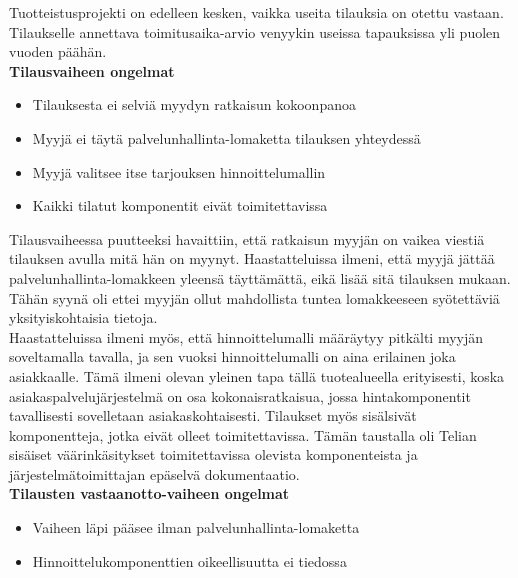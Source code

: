 \documentclass[finnish,12pt,a4paper,pdftex]{article}
\begin{document}
\noindent Tuotteistusprojekti on edelleen kesken, vaikka useita tilauksia on otettu vastaan. Tilaukselle annettava toimitusaika-arvio venyykin useissa tapauksissa yli puolen vuoden päähän.\\


\textbf{Tilausvaiheen ongelmat}\\

\begin{itemize}
    \item Tilauksesta ei selviä myydyn ratkaisun kokoonpanoa
    \item Myyjä ei täytä palvelunhallinta-lomaketta tilauksen yhteydessä
    \item Myyjä valitsee itse tarjouksen hinnoittelumallin
    \item Kaikki tilatut komponentit eivät toimitettavissa
\end{itemize}

\noindent Tilausvaiheessa puutteeksi havaittiin, että ratkaisun myyjän on vaikea viestiä tilauksen avulla mitä hän on myynyt. Haastatteluissa ilmeni, että myyjä jättää palvelunhallinta-lomakkeen yleensä täyttämättä, eikä lisää sitä tilauksen mukaan. Tähän syynä oli ettei myyjän ollut mahdollista tuntea lomakkeeseen syötettäviä yksityiskohtaisia tietoja.\\

\noindent Haastatteluissa ilmeni myös, että hinnoittelumalli määräytyy pitkälti myyjän soveltamalla tavalla, ja sen vuoksi hinnoittelumalli on aina erilainen joka asiakkaalle. Tämä ilmeni olevan yleinen tapa tällä tuotealueella erityisesti, koska asiakaspalvelujärjestelmä on osa kokonaisratkaisua, jossa hintakomponentit tavallisesti sovelletaan asiakaskohtaisesti. Tilaukset myös sisälsivät komponentteja, jotka eivät olleet toimitettavissa. Tämän taustalla oli Telian sisäiset väärinkäsitykset toimitettavissa olevista komponenteista ja järjestelmätoimittajan epäselvä dokumentaatio.\\ 

\textbf{Tilausten vastaanotto-vaiheen ongelmat}\\
\begin{itemize}
    \item Vaiheen läpi pääsee ilman palvelunhallinta-lomaketta
    \item Hinnoittelukomponenttien oikeellisuutta ei tiedossa
\end{itemize}
\end{document}
